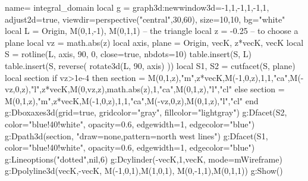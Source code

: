\documentclass[border=5pt]{standalone}%
\begin{document}
\begin{luadraw}{name= integral_domain}
local g = graph3d:new{window3d={-1,1,-1,1,-1,1}, adjust2d=true, 
    viewdir=perspective("central",30,60), size={10,10}, bg="white"}
local L = {Origin, M(0,1,-1), M(0,1,1)} -- the triangle
local z = -0.25 -- to choose a plane
local vz = math.abs(z)
local axis, plane = {Origin, vecK}, {z*vecK, vecK}
local S = rotline(L, axis, 90, 0, {close=true, nbdots=10})
table.insert(S, L)
table.insert(S, reverse( rotate3d(L, 90, axis) ))
local S1, S2 = cutfacet(S, plane)
local section 
if vz>1e-4 then
    section = {M(0,1,z),"m",z*vecK,M(-1,0,z),1,1,"ca",M(-vz,0,z),"l",z*vecK,M(0,vz,z),math.abs(z),1,"ca",M(0,1,z),"l","cl"}
else
    section = {M(0,1,z),"m",z*vecK,M(-1,0,z),1,1,"ca",M(-vz,0,z),M(0,1,z),"l","cl"}
end
g:Dboxaxes3d({grid=true, gridcolor="gray", fillcolor="lightgray"})
g:Dfacet(S2, {color="blue!40!white", opacity=0.6, edgewidth=1, edgecolor="blue"})
g:Dpath3d(section, "draw=none,pattern=north west lines")
g:Dfacet(S1, {color="blue!40!white", opacity=0.6, edgewidth=1, edgecolor="blue"})
g:Lineoptions("dotted",nil,6)
g:Dcylinder(-vecK,1,vecK, {mode=mWireframe})
g:Dpolyline3d({{vecK,-vecK}, {M(-1,0,1),M(1,0,1)}, {M(0,-1,1),M(0,1,1)}})
g:Show() 
\end{luadraw}
\end{document}
